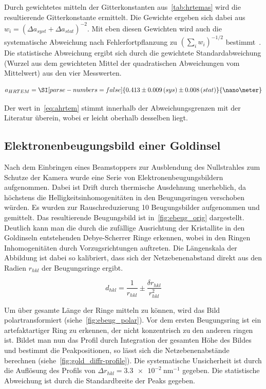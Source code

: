 \documentclass[slug=TEM, room=IFW, supervisor=?, coursedate=23.\ 01.\ 2020]{../../Lab_Report_LaTeX/lab_report}
\begin{document}
Durch gewichtetes mitteln der Gitterkonstanten aus~\ref{tab:hrtemas}
wird die resultierende Gitterkonstante ermittelt. Die Gewichte ergeben
sich dabei aus \(w_i = (\Delta a_{syst} + \Delta a_{stat})^{-2}\). Mit
eben diesen Gewichten wird auch die systematische Abweichung nach
Fehlerfortpflanzung zu \((\sum_i w_i)^{-1/2}\)
bestimmt~\cite{Aachen}. Die statistische Abweichung ergibt sich durch
die gewichtete Standardabweichung (Wurzel aus dem gewichteten Mittel
der quadratischen Abweichungen vom Mittelwert) aus den vier
Messwerten. 

\begin{equation}
  \label{eq:ahrtem}
  a_{HRTEM} = \SI[parse-numbers=false]{0.413\pm 0.009\,(sys)\pm 0.008\,(stat)}{\nano\meter} 
\end{equation}

Der wert in~\eqref{eq:ahrtem} stimmt innerhalb der Abweichungsgrenzen
mit der Literatur \"uberein, wobei er leicht oberhalb desselben liegt.

\subsection{Elektronenbeugungsbild einer Goldinsel}
\label{sec:golddiffr}

Nach dem Einbringen eines Beamstoppers zur Ausblendung des
Nullstrahles zum Schutze der Kamera wurde eine Serie von
Elektronenbeugungsbildern aufgenommen. Dabei ist Drift durch
thermische Ausdehnung unerheblich, da h\"ochstens die
Helligkeitsinhomogenit\"aten in den Beugungsringen verschoben
w\"urden. Es wurden zur Rauschreduzierung 10 Beugungsbilder
aufgenommen und gemittelt. Das resultierende Beugungsbild ist
in~\ref{fig:ebeug_orig} dargestellt. Deutlich kann man die durch die
zuf\"allige Ausrichtung der Kristallite in den Goldinseln entstehenden
Debye-Scherrer Ringe erkennen, wobei in den Ringen Inhomogenit\"aten
durch Vorzugsrichtungen auftreten. Die L\"angenskala der Abbildung ist
dabei so kalibriert, dass sich der Netzebenenabstand direkt aus den
Radien \(r_{hkl}\) der Beugungsringe ergibt.

\begin{equation}
  \label{eq:beugrad}
  d_{hkl} = \frac{1}{r_{hkl}} \pm \frac{\delta r_{hkl}}{r_{hkl}^2}
\end{equation}

Um \"uber gesamte L\"ange der Ringe mitteln zu k\"onnen, wird das Bild
polartransformiert (siehe~\ref{fig:ebeug_polar}). Vor dem ersten
Beugungsring ist ein artefaktartiger Ring zu erkennen, der nicht
konzentrisch zu den anderen ringen ist. Bildet man nun das Profil
durch Integration der gesamten H\"ohe des Bildes und bestimmt die
Peakpositionen, so l\"asst sich die Netzebenenabst\"ande berechnen
(siehe~\ref{fig:gold_diffr-profile}). Die systematische Unsicherheit
ist durch die Aufl\"osung des Profils von
\(\Delta r_{hkl}=\SI{3.3e-2}{\nano\meter^{-1}}\) gegeben. Die
statistische Abweichung ist durch die Standardbreite der Peaks gegeben.
\end{document}
